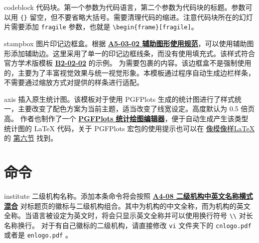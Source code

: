 \documentclass[a4paper,12pt]{article}
\begin{document}
\begin{CJK}{UTF8}{song}
\begin{docEnvironment*}[doc parameter=\marg{language}\marg{title}, doclang/environment content=code]{codeblock}{}
    代码块。第一个参数为代码语言，第二个参数为代码块的标题。参数可以用 \verb"{}" 留空，但不要省略大括号。需要清理代码的缩进。注意代码块所在的幻灯片需要添加 \verb"fragile" 参数，也就是 \verb"\begin{frame}[fragile]"。
\end{docEnvironment*}

\begin{docEnvironment*}[doclang/environment content=code]{stampbox}{}
    图片印记边框盒。根据 \href{http://vi.sjtu.edu.cn/index.php/articles/base/5}{\textbf{A5-03-02 辅助图形使用规范}}，可以使用辅助图形添加辅助边。这里采用了单一的印记边框线条，而没有使用填充式。该样式符合官方学术版模板 \href{http://vi.sjtu.edu.cn/index.php/articles/app/8}{\textbf{B2-02-02}} 的示例。 为需要包裹的内容。该边框盒不是强制使用的，主要为了丰富视觉效果与统一视觉形象。本模板通过程序自动生成边栏样条，不需要通过缩放方式对提供的样条进行适配。
\end{docEnvironment*}

\begin{docEnvironment*}[doclang/environment content=code]{axis}{}
    插入原生统计图。该模板对于使用 \textsf{PGFPlots} 生成的统计图进行了样式统一，主要改变了配色方案为当前主题，适当改变了线宽设定。高度默认为 0.5 倍页高。
    作者也制作了一个 \href{https://logcreative.github.io/PGFPlotsEdt/index.html?lang=cn}{\textbf{PGFPlots 统计绘图编辑器}}，便于自动生成产生该类型统计图的 \LaTeX{} 代码，关于 \textsf{PGFPlots} 宏包的使用提示也可以在 \href{https://logcreative.github.io/LaTeXSparkle/}{像模像样\LaTeX} 的 \href{https://logcreative.github.io/LaTeXSparkle/src/art/chapter06.html}{第六节} 找到。
\end{docEnvironment*}

\section{命令}

\begin{docCommand*}[]{institute}{}
    二级机构名称。添加本条命令将会按照 \href{https://vi.sjtu.edu.cn/index.php/articles/base/4}{\textbf{A4-08 二级机构中英文名称横式混合}} 对标题页的徽标与二级机构组合。其中为机构的中文全称，而为机构的英文全称。当语言被设定为英文时，将会只显示英文全称并可以使用换行符号 \verb"\\" 对长名称换行。
    对于有自己徽标的二级机构，请直接修改 \verb"vi" 文件夹下的 \verb"cnlogo.pdf" 或者是 \verb"enlogo.pdf" 。
\end{docCommand*}


\end{CJK}
\end{document}

